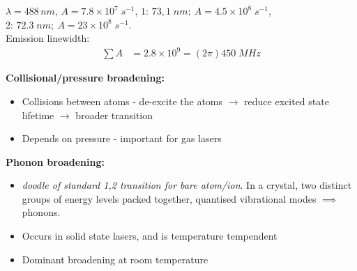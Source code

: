 \documentclass[a4paper, 11pt, normalem]{report}
\begin{document}
\begin{example}
    \begin{figure}[H]
        \centering
    \end{figure}
    $\lambda = 488\,nm$, $A= 7.8\times10^7\;s^{-1}$, $1:\,73,1\;nm;~ A=4.5\times10^8\;s^{-1}$, $2:\,72.3\;nm;~ A=23\times10^8\;s^{-1}$.\\
    Emission linewidth:
    \begin{align}
        \sum A &= 2.8\times10^9 = (2\pi)450\;MHz
    \end{align}
\end{example}
\textbf{Collisional/pressure broadening:}
\begin{itemize}
    \item Collisions between atoms - de-excite the atoms $\to$ reduce excited state lifetime $\to$ broader transition
    \item Depends on pressure - important for gas lasers
\end{itemize}
\textbf{Phonon broadening:}
\begin{itemize}
    \item \textit{doodle of standard 1,2 transition for bare atom/ion}. In a crystal, two distinct groups of energy levels packed together, quantised vibrational modes $\implies$ phonons. 
    \item Occurs in solid state lasers, and is temperature tempendent
    \item Dominant broadening at room temperature
\end{itemize}
\end{document}

